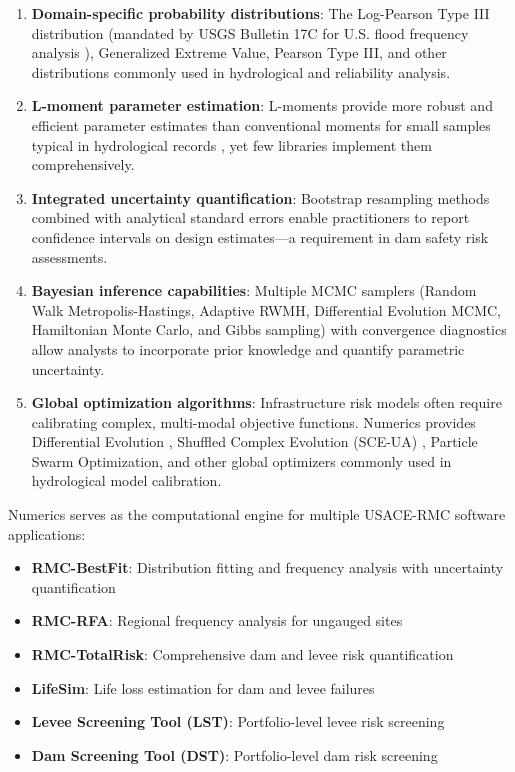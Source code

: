 \documentclass[10pt,a4paper,onecolumn]{article}
\begin{document}
\begin{enumerate}
    \item \textbf{Domain-specific probability distributions}: The Log-Pearson Type III distribution (mandated by USGS Bulletin 17C for U.S. flood frequency analysis \citep{england2019}), Generalized Extreme Value, Pearson Type III, and other distributions commonly used in hydrological and reliability analysis.

    \item \textbf{L-moment parameter estimation}: L-moments provide more robust and efficient parameter estimates than conventional moments for small samples typical in hydrological records \citep{hosking1997}, yet few libraries implement them comprehensively.

    \item \textbf{Integrated uncertainty quantification}: Bootstrap resampling methods combined with analytical standard errors enable practitioners to report confidence intervals on design estimates---a requirement in dam safety risk assessments.

    \item \textbf{Bayesian inference capabilities}: Multiple MCMC samplers (Random Walk Metropolis-Hastings, Adaptive RWMH, Differential Evolution MCMC, Hamiltonian Monte Carlo, and Gibbs sampling) with convergence diagnostics allow analysts to incorporate prior knowledge and quantify parametric uncertainty.

    \item \textbf{Global optimization algorithms}: Infrastructure risk models often require calibrating complex, multi-modal objective functions. Numerics provides Differential Evolution \citep{storn1997}, Shuffled Complex Evolution (SCE-UA) \citep{duan1994}, Particle Swarm Optimization, and other global optimizers commonly used in hydrological model calibration.
\end{enumerate}

Numerics serves as the computational engine for multiple USACE-RMC software applications:

\begin{itemize}
    \item \textbf{RMC-BestFit}: Distribution fitting and frequency analysis with uncertainty quantification
    \item \textbf{RMC-RFA}: Regional frequency analysis for ungauged sites
    \item \textbf{RMC-TotalRisk}: Comprehensive dam and levee risk quantification
    \item \textbf{LifeSim}: Life loss estimation for dam and levee failures
    \item \textbf{Levee Screening Tool (LST)}: Portfolio-level levee risk screening
    \item \textbf{Dam Screening Tool (DST)}: Portfolio-level dam risk screening
\end{itemize}
\end{document}
